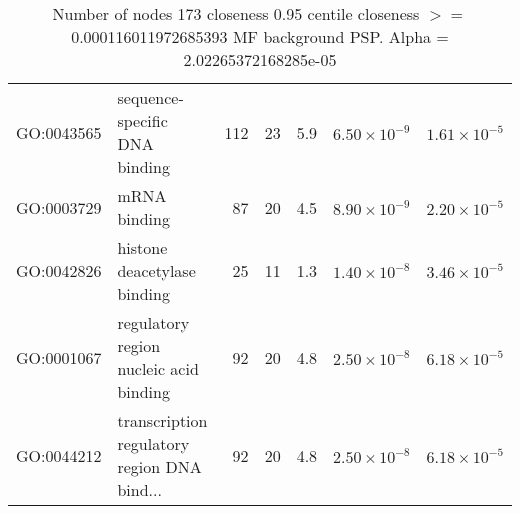 \begin{table}[ht]
\begin{adjustbox}{max width=\textwidth}
\begin{tabular}{llrrrrr}
  GO:0043565 & sequence-specific DNA binding & 112 & 23 & 5.9 & $6.50 \times 10^{-9}$ & $1.61 \times 10^{-5}$ \\ 
  GO:0003729 & mRNA binding & 87 & 20 & 4.5 & $8.90 \times 10^{-9}$ & $2.20 \times 10^{-5}$ \\ 
  GO:0042826 & histone deacetylase binding & 25 & 11 & 1.3 & $1.40 \times 10^{-8}$ & $3.46 \times 10^{-5}$ \\ 
  GO:0001067 & regulatory region nucleic acid binding & 92 & 20 & 4.8 & $2.50 \times 10^{-8}$ & $6.18 \times 10^{-5}$ \\ 
  GO:0044212 & transcription regulatory region DNA bind... & 92 & 20 & 4.8 & $2.50 \times 10^{-8}$ & $6.18 \times 10^{-5}$ \\ 
   \hline
\end{tabular}
\end{adjustbox}
\caption{Number of nodes 173 closeness 0.95 centile  closeness $>=$ 0.000116011972685393 MF background PSP. Alpha = 2.02265372168285e-05} 
\label{tab:Number of nodes 173 closeness 0.95 centile  closeness $>=$ 0.000116011972685393 MF background PSP. Alpha = 2.02265372168285e-05}
\end{table}





